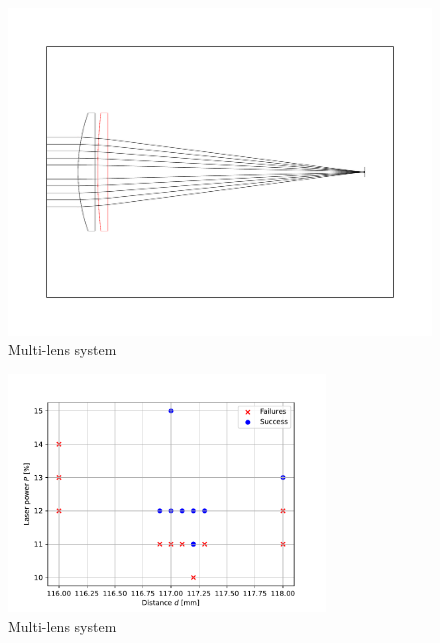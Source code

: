                 \begin{figure}[!ht]
                    \centering
                    \includegraphics[width=\textwidth]{assets/4 experiments/500 and 150 lenses.pdf}
                    \caption{Multi-lens system}
                \end{figure}
    
    
                \begin{figure}[!ht]
                    \centering
                    \includegraphics[width=0.75\textwidth]{assets/4 experiments/duallens_focus_threshold.pdf}
                    \caption{Multi-lens system}
                \end{figure}
    
    
